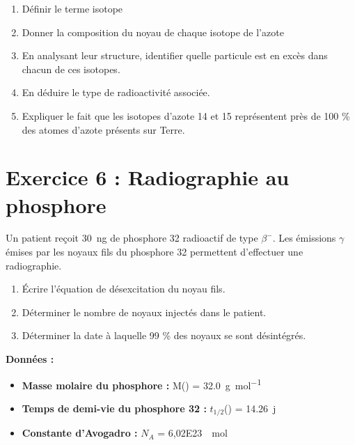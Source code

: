 \documentclass[a4paper,11pt,fleqn]{article}%
\begin{document}
\begin{enumerate}
    \item Définir le terme isotope
    \item Donner la composition du noyau de chaque isotope de l'azote
    \item En analysant leur structure, identifier quelle particule est en excès dans chacun de ces isotopes.
    \item En déduire le type de radioactivité associée.
    \item Expliquer le fait que les isotopes d'azote 14 et 15 représentent près de 100 \% des atomes d'azote présents sur Terre.
\end{enumerate}

\section*{Exercice 6 : Radiographie au phosphore}
Un patient reçoit \SI{30}{ng} de phosphore 32 radioactif de type $\beta ^{-}$. Les émissions $\gamma$ émises par les noyaux fils du phosphore 32 permettent d'effectuer une radiographie.
\begin{enumerate}
    \item Écrire l'équation de désexcitation du noyau fils.
    \item Déterminer le nombre de noyaux injectés dans le patient.
    \item Déterminer la date à laquelle 99 \% des noyaux se sont désintégrés.    
\end{enumerate}
\textbf{Données :}
\begin{itemize}
    \item \textbf{Masse molaire du phosphore :} M() = \SI{32,0}{\gram\per\mole}
    \item \textbf{Temps de demi-vie du phosphore 32 :} $t_{1/2}$() = \SI{14,26}{j}
    \item \textbf{Constante d'Avogadro :} $N_A$ = \SI{6,02E23}{\per\mole}
\end{itemize}
\end{document}
